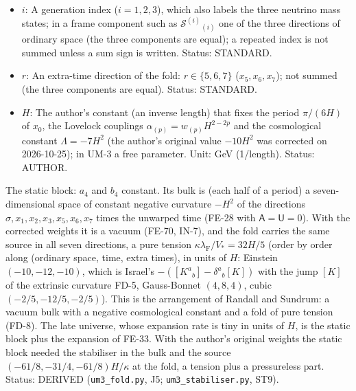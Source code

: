 \documentclass[
  10pt,
]{article}
\begin{document}
\begin{itemize}
  energy density, \(\mathcal{S}^1{}_1\) and \(\mathcal{S}^5{}_5\) its
  pressures along ordinary space and along the extra times (frame
  components along the fold, eight-dimensional normalisation: an energy
  per unit volume of the six other directions of the fold). Unit:
  GeV\(^7\). Value:
  \(\kappa\mathcal{S}^a{}_b = -\frac{32}{5}H\delta^a{}_b\) at the static
  block. Status: DERIVED.
\item
  \(i\): A generation index (\(i = 1, 2, 3\)), which also labels the
  three neutrino mass states; in a frame component such as
  \(\mathcal{S}^{(i)}{}_{(i)}\) one of the three directions of ordinary
  space (the three components are equal); a repeated index is not summed
  unless a sum sign is written. Status: STANDARD.
\item
  \(r\): An extra-time direction of the fold: \(r \in \{5, 6, 7\}\)
  (\(x_5, x_6, x_7\)); not summed (the three components are equal).
  Status: STANDARD.
\item
  \(H\): The author's constant (an inverse length) that fixes the period
  \(\pi/(6H)\) of \(x_0\), the Lovelock couplings
  \(\alpha_{(p)} = w_{(p)}H^{2-2p}\) and the cosmological constant
  \(\Lambda = -7H^2\) (the author's original value \(-10H^2\) was
  corrected on 2026-10-25); in UM-3 a free parameter. Unit: GeV
  (1/length). Status: AUTHOR.
\end{itemize}

The static block: \(a_4\) and \(b_4\) constant. Its bulk is (each half
of a period) a seven-dimensional space of constant negative curvature
\(-H^2\) of the directions \(\sigma, x_1, x_2, x_3, x_5, x_6, x_7\)
times the unwarped time (FE-28 with \(\mathsf{A} = \mathsf{U} = 0\)).
With the corrected weights it is a vacuum (FE-70, IN-7), and the fold
carries the same source in all seven directions, a pure tension
\(\kappa\lambda_{\mathrm{F}}/V_* = 32H/5\) (order by order along
(ordinary space, time, extra times), in units of \(H\): Einstein
\((-10, -12, -10)\), which is Israel's
\(-([K^a{}_b] - \delta^a{}_b[K])\) with the jump \([K]\) of the
extrinsic curvature FD-5, Gauss-Bonnet \((4, 8, 4)\), cubic
\((-2/5, -12/5, -2/5)\)). This is the arrangement of Randall and
Sundrum: a vacuum bulk with a negative cosmological constant and a fold
of pure tension (FD-8). The late universe, whose expansion rate is tiny
in units of \(H\), is the static block plus the expansion of FE-33. With
the author's original weights the static block needed the stabiliser in
the bulk and the source \((-61/8, -31/4, -61/8)H/\kappa\) at the fold, a
tension plus a pressureless part. Status: DERIVED
(\texttt{um3\_fold.py}, J5; \texttt{um3\_stabiliser.py}, ST9).
\end{document}
